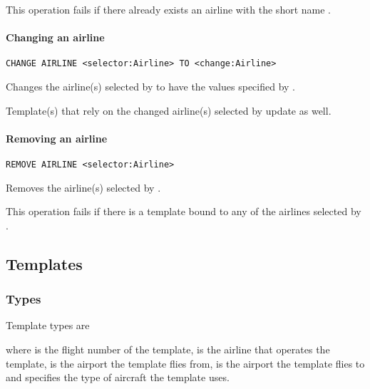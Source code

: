 This operation fails if there already exists an airline with the short name
.

\paragraph{Changing an airline}
\begin{operation}
  \lstinline{CHANGE AIRLINE <selector:Airline> TO <change:Airline>}
\end{operation}
Changes the airline(s) selected by  to have the values specified
by .

Template(s) that rely on the changed airline(s) selected by 
update as well.

\paragraph{Removing an airline}
\begin{operation}
  \lstinline{REMOVE AIRLINE <selector:Airline>}
\end{operation}
Removes the airline(s) selected by .

This operation fails if there is a template bound to any of the airlines
selected by .


\subsection{Templates}
\subsubsection{Types}
Template types are
\begin{description}
  \item[] 
  \item[] 
  \item[] 
\end{description}
where  is the flight number of the template,  is the
airline that operates the template,  is the airport the template flies
from,  is the airport the template flies to and  specifies the
type of aircraft the template uses.

